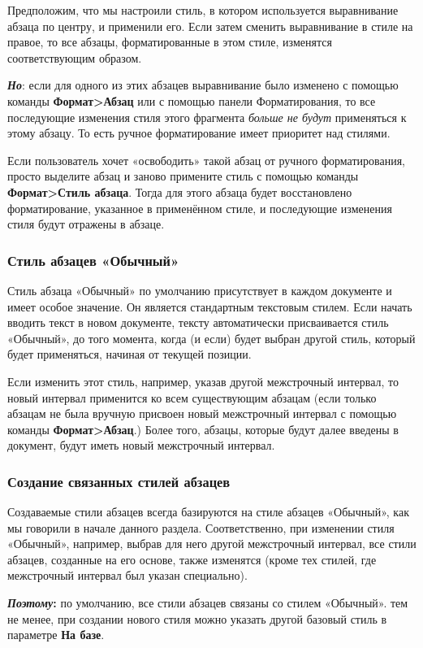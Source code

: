 \documentclass[a4paper,10pt]{article}
\begin{document}
Предположим, что мы настроили стиль, в котором используется выравнивание абзаца по центру, и применили его. Если затем сменить выравнивание в стиле на правое, то все абзацы, форматированные в этом стиле, изменятся соответствующим образом.

\textbf{\textit{Но}}: если для одного из этих абзацев выравнивание было изменено с помощью команды \textbf{Формат>Абзац} или с помощью панели Форматирования, то все последующие изменения стиля этого фрагмента \textit{больше не будут} применяться к этому абзацу. То есть ручное форматирование имеет приоритет над стилями.

Если пользователь хочет «освободить» такой абзац от ручного форматирования, просто выделите абзац и заново примените стиль с помощью команды \textbf{Формат>Стиль абзаца}. Тогда для этого абзаца будет восстановлено форматирование, указанное в применённом стиле, и последующие изменения стиля будут отражены в абзаце.

\subsubsection{Стиль абзацев «Обычный»}
Стиль абзаца «Обычный» по умолчанию присутствует в каждом документе и имеет особое значение. Он является стандартным текстовым стилем. Если начать вводить текст в новом документе, тексту автоматически присваивается стиль «Обычный», до того момента, когда (и если) будет выбран другой стиль, который будет применяться, начиная от текущей позиции.

Если изменить этот стиль, например, указав другой межстрочный интервал, то новый интервал применится ко всем существующим абзацам (если только абзацам не была вручную присвоен новый межстрочный интервал с помощью команды \textbf{Формат>Абзац}.) Более того, абзацы, которые будут далее введены в документ, будут иметь новый межстрочный интервал.

\subsubsection{Создание связанных стилей абзацев}
Создаваемые стили абзацев всегда базируются на стиле абзацев «Обычный», как мы говорили в начале данного раздела. Соответственно, при изменении стиля «Обычный», например, выбрав для него другой межстрочный интервал, все стили абзацев, созданные на его основе, также изменятся (кроме тех стилей, где межстрочный интервал был указан специально).

\begin{mdframed}[backgroundcolor=blue!10]
\textbf{\textit{Поэтому}:} по умолчанию, все стили абзацев связаны со стилем «Обычный». тем не менее, при создании нового стиля можно указать другой базовый стиль в параметре \textbf{На базе}.
\end{mdframed}
\end{document}

